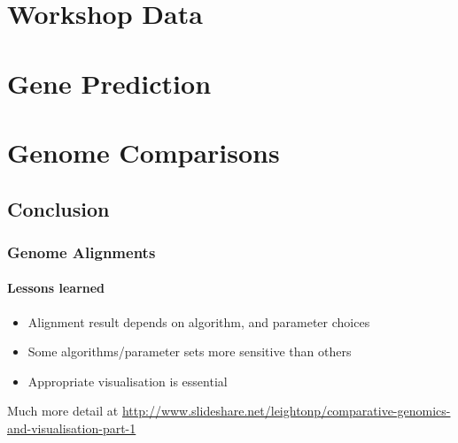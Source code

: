 \section{Workshop Data}
  
  

\section{Gene Prediction}
  
  
  
  

\section{Genome Comparisons}
  
  

\subsection{Conclusion}
\begin{frame}
  \frametitle{Genome Alignments}   
  \framesubtitle{Lessons learned}   
  \begin{itemize}
    \item Alignment result depends on algorithm, and parameter choices
    \item Some algorithms/parameter sets more sensitive than others
    \item Appropriate visualisation is essential
  \end{itemize}
  Much more detail at \url{http://www.slideshare.net/leightonp/comparative-genomics-and-visualisation-part-1}
\end{frame}

%  

